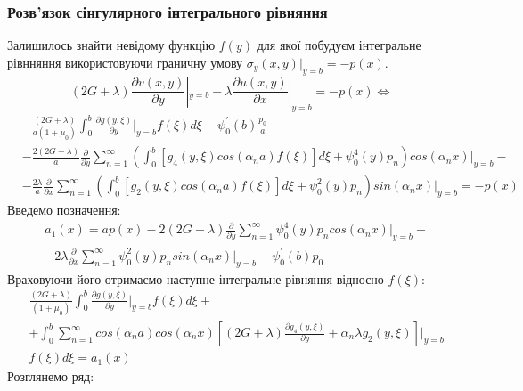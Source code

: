 \subsubsection{Розв'язок сінгулярного інтегрального рівняння}
Залишилось знайти невідому функцію $f(y)$ для якої побудуєм інтегральне рівнняння використовуючи граничну умову $\sigma_y(x, y) |_{y=b} = -p(x)$.
\begin{equation*}
    (2G + \lambda)\frac{\partial v(x,y)}{\partial y}|_{y=b} + \lambda\frac{\partial u(x,y)}{\partial x}|_{y=b} = -p(x) \Leftrightarrow
\end{equation*}
\begin{align*}
    &-\frac{(2G + \lambda)}{a(1+\mu_0)} \int_{0}^{b}\frac{\partial g(y, \xi)}{\partial y}|_{y=b} f(\xi) d\xi - \psi_0^{'}(b) \frac{p_0}{a} - \\
    &- \frac{2(2G + \lambda)}{a} \frac{\partial}{\partial y} \sum_{n=1}^{\infty} \left( \int_0^b \left[g_4(y, \xi) cos(\alpha_n a) f(\xi) \right]d\xi + \psi_0^{4}(y) p_n \right) cos(\alpha_n x)|_{y=b} - \\
    & -\frac{2\lambda}{a} \frac{\partial}{\partial x} \sum_{n=1}^{\infty} \left( \int_0^b \left[g_2(y, \xi)cos(\alpha_n a) f(\xi) \right]d\xi + \psi_0^2(y) p_n \right) sin(\alpha_n x)|_{y=b} = -p(x)
\end{align*}
Введемо позначення:
\begin{align}
    &a_1(x) = a p(x) - 2(2G + \lambda) \frac{\partial}{\partial y} \sum_{n=1}^{\infty} \psi_0^{4}(y) p_n cos(\alpha_n x)|_{y=b} - \nonumber \\
    &- 2\lambda \frac{\partial}{\partial x} \sum_{n=1}^{\infty}\psi_0^2(y) p_n sin(\alpha_n x)|_{y=b} - \psi_0^{'}(b) p_0
\end{align}
Враховуючи його отримаємо наступне інтегральне рівняння відносно $f(\xi)$:
\begin{align}\label{int_dynamic_2}
    &\frac{(2G + \lambda)}{(1+\mu_0)} \int_{0}^{b}\frac{\partial g(y, \xi)}{\partial y}|_{y=b} f(\xi) d\xi + \nonumber \\ 
    &+ \int_{0}^{b} \sum_{n=1}^{\infty} cos(\alpha_n a) cos(\alpha_n x) \left[(2G + \lambda) \frac{\partial g_4(y, \xi)}{\partial y} + \alpha_n \lambda g_2(y, \xi) \right]|_{y=b} \nonumber \\
    &f(\xi) d\xi = a_1(x)
\end{align}
Розглянемо ряд:

